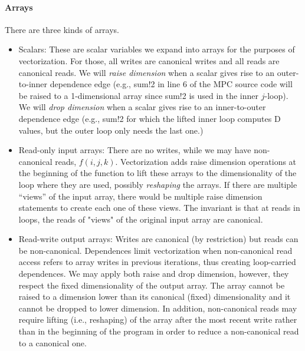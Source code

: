 \paragraph{Arrays} There are three kinds of arrays.
\begin{itemize}

\item Scalars: These are scalar variables we expand into arrays for the purposes of vectorization.
For those, all writes are canonical writes and all reads are canonical reads. We will \emph{raise dimension} when
a scalar gives rise to an outer-to-inner dependence edge (e.g., {\sf sum!2} in line 6 of the MPC source code will be raised to a 1-dimensional
array since {\sf sum!2} is used in the inner $j$-loop). We will \emph{drop dimension} when a scalar
gives rise to an inner-to-outer dependence edge (e.g., {\sf sum!2} for which the lifted inner loop computes
{\sf D} values, but the outer loop only needs the last one.)

\item Read-only input arrays: There are no writes, while we may have non-canonical reads, $f(i,j,k)$.
Vectorization adds raise dimension operations at the beginning of the function to lift these arrays to 
the dimensionality of the loop where they are used, possibly \emph{reshaping} the arrays. 
If there are multiple ``views'' of the input array, there would be multiple raise dimension statements to create
each one of these views. The invariant is that at reads in loops, the reads of "views" of the original input array are canonical.

 \item Read-write output arrays: Writes are canonical (by restriction) but reads can be non-canonical.
 Dependences limit vectorization when non-canonical read access refers to array writes in
 previous iterations, thus creating loop-carried dependences. We may apply both raise and drop dimension, however,
 they respect the fixed dimensionality of the output array. The array cannot be raised to a dimension lower than
 its canonical (fixed) dimensionality and it cannot be dropped to lower dimension. In addition, non-canonical reads may
 require lifting (i.e., reshaping) of the array after the most recent write rather than in the beginning of the program
 in order to reduce a non-canonical read to a canonical one.

\end{itemize}

